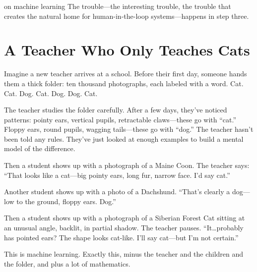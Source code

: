 
\label{chap:ch03}
\begin{chapterquote}{on machine learning}
The trouble---the interesting trouble, the trouble that creates the natural home for human-in-the-loop systems---happens in step three.
\end{chapterquote}

\section{A Teacher Who Only Teaches Cats}

Imagine a new teacher arrives at a school. Before their first day, someone hands them a thick folder: ten thousand photographs, each labeled with a word. Cat. Cat. Dog. Cat. Dog. Dog. Cat.

The teacher studies the folder carefully. After a few days, they've noticed patterns: pointy ears, vertical pupils, retractable claws---these go with ``cat.'' Floppy ears, round pupils, wagging tails---these go with ``dog.'' The teacher hasn't been told any rules. They've just looked at enough examples to build a mental model of the difference.

Then a student shows up with a photograph of a Maine Coon. The teacher says: ``That looks like a cat---big pointy ears, long fur, narrow face. I'd say cat.''

Another student shows up with a photo of a Dachshund. ``That's clearly a dog---low to the ground, floppy ears. Dog.''

Then a student shows up with a photograph of a Siberian Forest Cat sitting at an unusual angle, backlit, in partial shadow. The teacher pauses. ``It\ldots probably has pointed ears? The shape looks cat-like. I'll say cat---but I'm not certain.''

This is machine learning. Exactly this, minus the teacher and the children and the folder, and plus a lot of mathematics.

